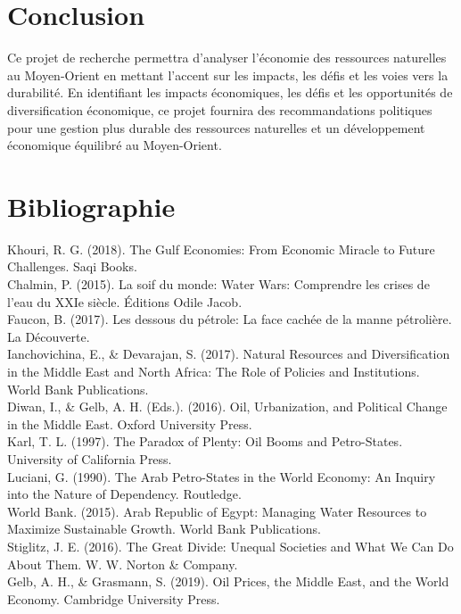 \documentclass[a4paper, 12pt]{report}
\begin{document}
\section*{Conclusion}

Ce projet de recherche permettra d'analyser l'économie des ressources naturelles au Moyen-Orient en mettant l'accent sur les impacts, les défis et les voies vers la durabilité. En identifiant les impacts économiques, les défis et les opportunités de diversification économique, ce projet fournira des recommandations politiques pour une gestion plus durable des ressources naturelles et un développement économique équilibré au Moyen-Orient.

\section*{Bibliographie}

Khouri, R. G. (2018). The Gulf Economies: From Economic Miracle to Future Challenges. Saqi Books. \\

Chalmin, P. (2015). La soif du monde: Water Wars: Comprendre les crises de l'eau du XXIe siècle. Éditions Odile Jacob.\\

Faucon, B. (2017). Les dessous du pétrole: La face cachée de la manne pétrolière. La Découverte.\\

Ianchovichina, E., & Devarajan, S. (2017). Natural Resources and Diversification in the Middle East and North Africa: The Role of Policies and Institutions. World Bank Publications.\\

Diwan, I., & Gelb, A. H. (Eds.). (2016). Oil, Urbanization, and Political Change in the Middle East. Oxford University Press.\\

Karl, T. L. (1997). The Paradox of Plenty: Oil Booms and Petro-States. University of California Press.\\

Luciani, G. (1990). The Arab Petro-States in the World Economy: An Inquiry into the Nature of Dependency. Routledge.\\

World Bank. (2015). Arab Republic of Egypt: Managing Water Resources to Maximize Sustainable Growth. World Bank Publications.\\

Stiglitz, J. E. (2016). The Great Divide: Unequal Societies and What We Can Do About Them. W. W. Norton & Company.\\

Gelb, A. H., & Grasmann, S. (2019). Oil Prices, the Middle East, and the World Economy. Cambridge University Press.\\
\end{document}
